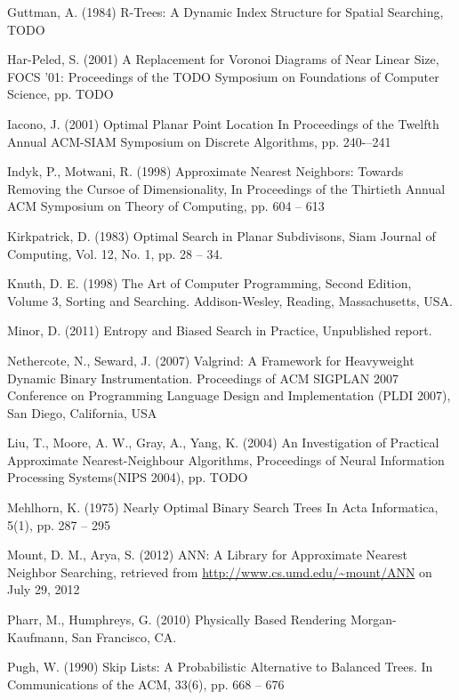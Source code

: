 \documentclass[mcs]{scsthesis}
\begin{document}
\begin{thebibliography}{5}
Guttman, A. (1984) R-Trees: A Dynamic Index Structure for Spatial Searching,
TODO 

Har-Peled, S. (2001) A Replacement for Voronoi Diagrams of Near Linear Size, 
FOCS '01: Proceedings of the TODO Symposium on Foundations of Computer Science, 
pp. TODO

Iacono, J. (2001) Optimal Planar Point Location
In Proceedings of the Twelfth Annual ACM-SIAM Symposium on Discrete Algorithms,
pp. 240-–241

Indyk, P., Motwani, R. (1998) Approximate Nearest Neighbors: Towards Removing
the Cursoe of Dimensionality, In Proceedings of the Thirtieth Annual ACM
Symposium on Theory of Computing, pp. 604 -- 613 

Kirkpatrick, D. (1983) Optimal Search in Planar Subdivisons,
Siam Journal of Computing, Vol. 12, No. 1, pp. 28 -- 34.

Knuth, D. E. (1998) The Art of Computer Programming, Second Edition,
Volume 3, Sorting and Searching.  Addison-Wesley, Reading, Massachusetts, USA.

Minor, D. (2011) Entropy and Biased Search in Practice, Unpublished report.

Nethercote, N., Seward, J. (2007) Valgrind: A Framework for Heavyweight Dynamic
Binary Instrumentation.  Proceedings of ACM SIGPLAN 2007 Conference on
Programming Language Design and Implementation (PLDI 2007),
San Diego, California, USA 

Liu, T., Moore, A. W., Gray, A., Yang, K. (2004) An Investigation of Practical
Approximate Nearest-Neighbour Algorithms, Proceedings of Neural Information
Processing Systems(NIPS 2004), pp. TODO  

Mehlhorn, K. (1975) Nearly Optimal Binary Search Trees 
In Acta Informatica, 5(1), pp. 287 – 295

Mount, D. M., Arya, S. (2012) ANN: A Library for Approximate Nearest Neighbor
Searching, retrieved from \url{http://www.cs.umd.edu/~mount/ANN} on July 29, 2012 

Pharr, M., Humphreys, G. (2010) Physically Based Rendering
Morgan-Kaufmann, San Francisco, CA.  

Pugh, W. (1990) Skip Lists: A Probabilistic Alternative to Balanced Trees.
In Communications of the ACM, 33(6), pp. 668 – 676


\end{thebibliography}
\end{document}
